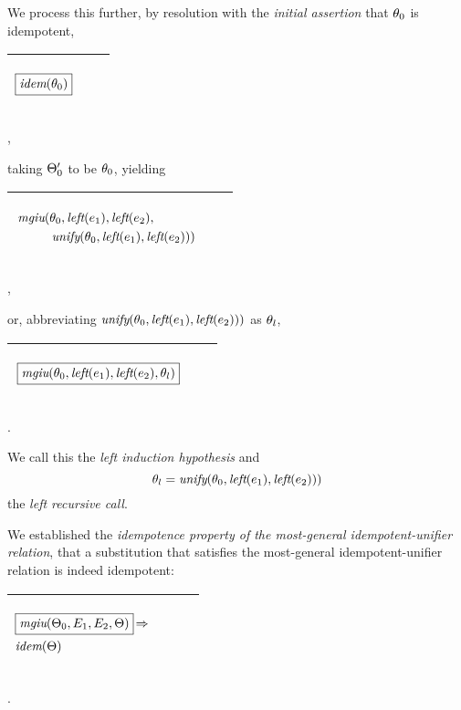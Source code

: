 \documentclass[runningheads]{llncs}
\DeclareMathOperator{\uimplies}{\Rightarrow}
\DeclareMathOperator{\unify}{\emph{unify}}
\DeclareMathOperator{\lef}{\emph{left}}
\DeclareMathOperator{\idem}{\emph{idem}}
\DeclareMathOperator{\mgiu}{\emph{mgiu}}
\begin{document}
We process this further, by resolution with the \emph{initial assertion} that $\theta_{0}$ is idempotent,
\begin{center}
\begin{tabular}{|m{}|m{}||m{}|}
 \hline 
\begin{center}$\boxed{\idem(\thet{0})}$\end{center} &  & \\
\hline
\end{tabular},
\end{center}
taking $\Theta_{0}'$ to be $\theta_{0}$, yielding
  \begin{center}
  \begin{tabular}{|m{}|m{}||m{}|}
\hline
\begin{center}
{$\begin{aligned}
    {\,\mgiu}(&\thet{0}, \lef(\e{1}), \lef(\e{2}), \\
    &\unify(\thet{0}, \lef(\e{1}), \lef(\e{2}))) 
\end{aligned}  $}  \hspace{1cm} 
\end{center}& &  \\  \hline
\end{tabular},
\end{center}
or, abbreviating  $\unify(\thet{0}, \lef(\e{1}), \lef(\e{2})))$ as  $\theta_{l}$,
  \begin{center}
  \begin{tabular}{|m{}|m{}||m{}|}
\hline
\begin{center}
   ${\,\boxed{\mgiu(\thet{0}, \lef(\e{1}), \lef(\e{2}), \thet{l})}}$
   \end{center}  
& &  \\  \hline
\end{tabular}.
\end{center}
We call this the \emph{left induction hypothesis} and \[\thet{l} = \unify(\thet{0}, \lef(\e{1}), \lef(\e{2})))\] the \emph{left recursive call}. 

We established the \emph{idempotence property of the most-general idempotent-unifier relation}, that a substitution that satisfies the most-general idempotent-unifier relation is indeed idempotent:
\begin{center}
  \begin{tabular}{|m{}|m{}||m{}|}
\hline
\begin{center}
{$
\begin{aligned}
&\begin{aligned}
&\boxed{{\mgiu}(\Thet{0}, \E{1}, \E{2}, \Theta)} \uimplies \\
&\begin{aligned}
\idem(\Theta)
\end{aligned}
\end{aligned}
\end{aligned} $}  \hspace{0cm} 
\end{center}& &  \\  \hline
\end{tabular}.
\end{center}
\end{document}
